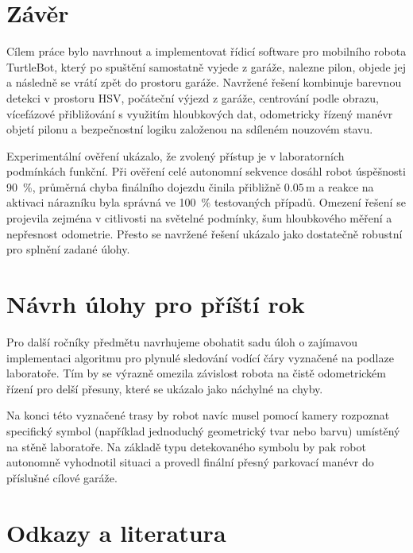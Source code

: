 \documentclass[a4paper,11pt]{article}
\begin{document}
\section{Závěr}
Cílem práce bylo navrhnout a implementovat řídicí software pro mobilního robota TurtleBot, který po spuštění samostatně vyjede z garáže, nalezne pilon, objede jej a následně se vrátí zpět do prostoru garáže. Navržené řešení kombinuje barevnou detekci v prostoru HSV, počáteční výjezd z garáže, centrování podle obrazu, vícefázové přibližování s využitím hloubkových dat, odometricky řízený manévr objetí pilonu a bezpečnostní logiku založenou na sdíleném nouzovém stavu.

Experimentální ověření ukázalo, že zvolený přístup je v laboratorních podmínkách funkční. Při ověření celé autonomní sekvence dosáhl robot úspěšnosti 90~\%, průměrná chyba finálního dojezdu činila přibližně $0.05\,\mathrm{m}$ a reakce na aktivaci nárazníku byla správná ve 100~\% testovaných případů. Omezení řešení se projevila zejména v citlivosti na světelné podmínky, šum hloubkového měření a nepřesnost odometrie. Přesto se navržené řešení ukázalo jako dostatečně robustní pro splnění zadané úlohy.

\section{Návrh úlohy pro příští rok}
Pro další ročníky předmětu navrhujeme obohatit sadu úloh o zajímavou implementaci algoritmu pro plynulé sledování vodící čáry vyznačené na podlaze laboratoře. Tím by se výrazně omezila závislost robota na čistě odometrickém řízení pro delší přesuny, které se ukázalo jako náchylné na chyby.

Na konci této vyznačené trasy by robot navíc musel pomocí kamery rozpoznat specifický symbol (například jednoduchý geometrický tvar nebo barvu) umístěný na stěně laboratoře. Na základě typu detekovaného symbolu by pak robot autonomně vyhodnotil situaci a provedl finální přesný parkovací manévr do příslušné cílové garáže.

\newpage

\section{Odkazy a literatura}
\end{document}
